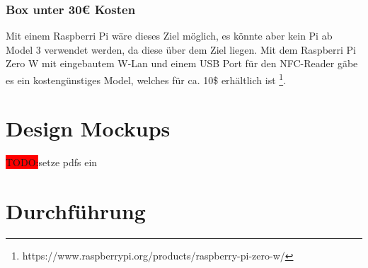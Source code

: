 \documentclass[10pt, a4paper]{article}
\begin{document}
\subsubsection{Box unter 30€ Kosten}
Mit einem Raspberri Pi wäre dieses Ziel möglich, es könnte aber kein Pi ab Model 3 verwendet werden, da diese über dem Ziel liegen.
Mit dem Raspberri Pi Zero W mit eingebautem W-Lan und einem USB Port für den NFC-Reader gäbe es ein kostengünstiges Model, welches für ca. 10\$ erhältlich ist \footnote{https://www.raspberrypi.org/products/raspberry-pi-zero-w/}.

\section{Design Mockups}
\colorbox{red}{TODO:}setze pdfs ein

\section{Durchführung}
\end{document}
